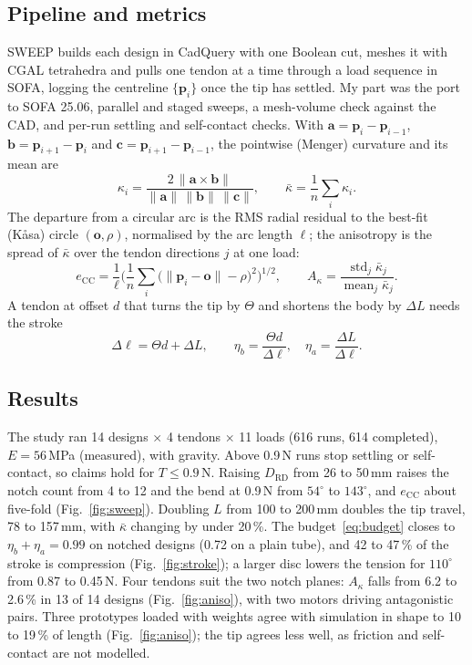 \documentclass[conference]{IEEEtran}
\newcommand{\DRD}{D_{\mathrm{RD}}}
\begin{document}
\subsection{Pipeline and metrics}
SWEEP builds each design in CadQuery with one Boolean cut, meshes it with CGAL tetrahedra and pulls one tendon at a time
through a load sequence in SOFA, logging the centreline $\{\bm p_i\}$ once the tip has settled. My part was the port to
SOFA 25.06, parallel and staged sweeps, a mesh-volume check against the CAD, and per-run settling and self-contact
checks. With $\bm a=\bm p_i-\bm p_{i-1}$, $\bm b=\bm p_{i+1}-\bm p_i$ and $\bm c=\bm p_{i+1}-\bm p_{i-1}$, the
pointwise (Menger) curvature and its mean are
\begin{equation}
\kappa_i=\frac{2\,\lVert\bm a\times\bm b\rVert}{\lVert\bm a\rVert\,\lVert\bm b\rVert\,\lVert\bm c\rVert},
\qquad \bar\kappa=\frac{1}{n}\sum_i\kappa_i .
\end{equation}
The departure from a circular arc is the RMS radial residual to the best-fit (Kåsa) circle $(\bm o,\rho)$, normalised by
the arc length $\ell$; the anisotropy is the spread of $\bar\kappa$ over the tendon directions $j$ at one load:
\begin{equation}
e_{\mathrm{CC}}=\frac1\ell\Big(\frac1n\sum_i\big(\lVert\bm p_i-\bm o\rVert-\rho\big)^2\Big)^{\!1/2},\qquad
A_\kappa=\frac{\operatorname{std}_j\bar\kappa_j}{\operatorname{mean}_j\bar\kappa_j}.
\end{equation}
A tendon at offset $d$ that turns the tip by $\Theta$ and shortens the body by $\Delta L$ needs the stroke
\begin{equation}
\Delta\ell=\Theta d+\Delta L,\qquad \eta_b=\frac{\Theta d}{\Delta\ell},\quad \eta_a=\frac{\Delta L}{\Delta\ell}.
\label{eq:budget}
\end{equation}


\subsection{Results}
The study ran 14 designs $\times$ 4 tendons $\times$ 11 loads (616 runs, 614 completed), $E=56$\,MPa (measured), with
gravity. Above 0.9\,N runs stop settling or self-contact, so claims hold for $T\le0.9$\,N. Raising
$\DRD$ from 26 to 50\,mm raises the notch count from 4 to 12 and the bend at 0.9\,N from $54^\circ$ to $143^\circ$, and
$e_{\mathrm{CC}}$ about five-fold (Fig.~\ref{fig:sweep}). Doubling $L$ from 100 to 200\,mm doubles the tip travel, 78 to
157\,mm, with $\bar\kappa$ changing by under 20\,\%. The budget~\eqref{eq:budget} closes to $\eta_b+\eta_a=0.99$ on
notched designs (0.72 on a plain tube), and 42 to 47\,\% of the stroke is compression (Fig.~\ref{fig:stroke}); a larger
disc lowers the tension for $110^\circ$ from 0.87 to 0.45\,N. Four tendons suit the two notch planes: $A_\kappa$ falls
from 6.2 to 2.6\,\% in 13 of 14 designs (Fig.~\ref{fig:aniso}), with two motors driving antagonistic pairs. Three
prototypes loaded with weights agree with simulation in shape to 10 to 19\,\% of length (Fig.~\ref{fig:aniso}); the tip
agrees less well, as friction and self-contact are not modelled.
\end{document}
